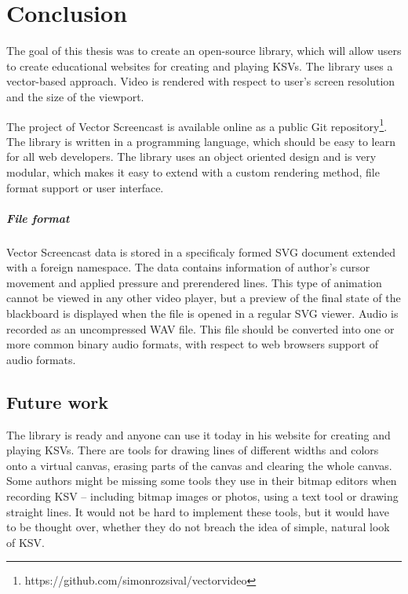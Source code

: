 \chapter*{Conclusion}

The goal of this thesis was to create an open-source library, which will allow users to create educational websites for creating and playing KSVs. The library uses a vector-based approach. Video is rendered with respect to user's screen resolution and the size of the viewport.

The project of Vector Screencast is available online as a public Git repository\footnote{https://github.com/simonrozsival/vectorvideo}. The library is written in a programming language, which should be easy to learn for all web developers. The library uses an object oriented design and is very modular, which makes it easy to extend with a custom rendering method, file format support or user interface.

\paragraph{File format} Vector Screencast data is stored in a specificaly formed SVG document extended with a foreign namespace. The data contains information of author's cursor movement and applied pressure and prerendered lines. This type of animation cannot be viewed in any other video player, but a preview of the final state of the blackboard is displayed when the file is opened in a regular SVG viewer. Audio is recorded as an uncompressed WAV file. This file should be converted into one or more common binary audio formats, with respect to web browsers support of audio formats. 


\section{Future work}
The library is ready and anyone can use it today in his website for creating and playing KSVs. There are tools for drawing lines of different widths and colors onto a virtual canvas, erasing parts of the canvas and clearing the whole canvas. Some authors might be missing some tools they use in their bitmap editors when recording KSV -- including bitmap images or photos, using a text tool or drawing straight lines. It would not be hard to implement these tools, but it would have to be thought over, whether they do not breach the idea of simple, natural look of KSV.


